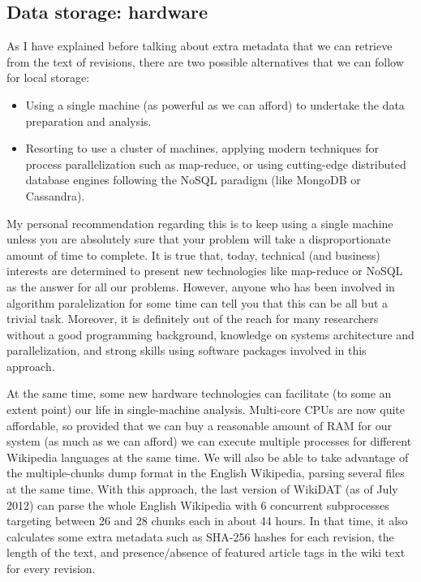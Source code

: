 \subsection{Data storage: hardware}
As I have explained before talking about extra metadata that we can retrieve from
the text of revisions, there are two possible alternatives that we can follow for
local storage:

\begin{itemize}
 \item Using a single machine (as powerful as we can afford) to undertake the
data preparation and analysis.
 \item Resorting to use a cluster of machines, applying modern techniques for
process parallelization such as map-reduce, or using cutting-edge distributed
database engines following the NoSQL paradigm (like MongoDB or Cassandra).
\end{itemize}

My personal recommendation regarding this is to keep using a single machine unless
you are absolutely sure that your problem will take a disproportionate amount of time
to complete. It is true that, today, technical (and business) interests are
determined to present new technologies like map-reduce or NoSQL as the answer for
all our problems. However, anyone who has been involved in algorithm paralelization
for some time can tell you that this can be all but a trivial task. Moreover,
it is definitely out of the reach for many researchers without a good programming
background, knowledge on systems architecture and parallelization, and strong skills
using software packages involved in this approach.

At the same time, some new hardware technologies can facilitate (to some an extent
point) our life in single-machine analysis. Multi-core CPUs are now quite affordable,
so provided that we can buy a reasonable amount of RAM for our system (as much as
we can afford) we can execute multiple processes for different Wikipedia 
languages at the same time. We will also be able to take advantage of the 
multiple-chunks dump format in the English Wikipedia, parsing several files 
at the same time. With this approach, the last version of WikiDAT (as of July
2012) can parse the whole English Wikipedia with 6 concurrent subprocesses 
targeting between 26 and 28 chunks each in about 44 hours. In that time, it
also calculates some extra metadata such as SHA-256 hashes for each revision, 
the length of the text, and presence/absence of featured article tags in the wiki
text for every revision.

